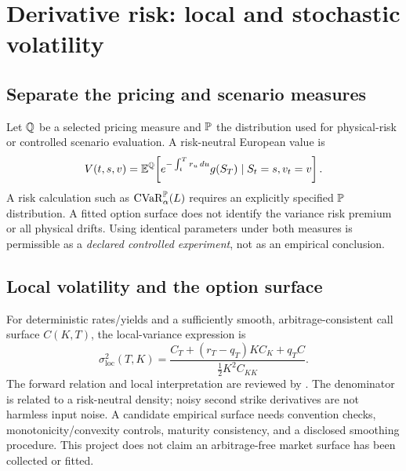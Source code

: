 \section{Derivative risk: local and stochastic volatility}\label{sec:lsv}
\subsection{Separate the pricing and scenario measures}
Let $\mathbb Q$ be a selected pricing measure and $\mathbb P$ the distribution used for physical-risk or controlled scenario evaluation. A risk-neutral European value is
\[
 V(t,s,v)=\mathbb E^{\mathbb Q}\!\left[e^{-\int_t^T r_u\,du}g(S_T)\mid S_t=s,v_t=v\right].
\]
A risk calculation such as $\operatorname{CVaR}_\alpha^{\mathbb P}(L)$ requires an explicitly specified $\mathbb P$ distribution. A fitted option surface does not identify the variance risk premium or all physical drifts. Using identical parameters under both measures is permissible as a \emph{declared controlled experiment}, not as an empirical conclusion.

\subsection{Local volatility and the option surface}
For deterministic rates/yields and a sufficiently smooth, arbitrage-consistent call surface $C(K,T)$, the local-variance expression is
\begin{equation}
 \sigma_{\mathrm{loc}}^2(T,K)=
 \frac{C_T+(r_T-q_T)K C_K+q_T C}{\tfrac12 K^2 C_{KK}}.\label{eq:dupire}
\end{equation}
The forward relation and local interpretation are reviewed by \citet{dupire2010}. The denominator is related to a risk-neutral density; noisy second strike derivatives are not harmless input noise. A candidate empirical surface needs convention checks, monotonicity/convexity controls, maturity consistency, and a disclosed smoothing procedure. This project does not claim an arbitrage-free market surface has been collected or fitted.

